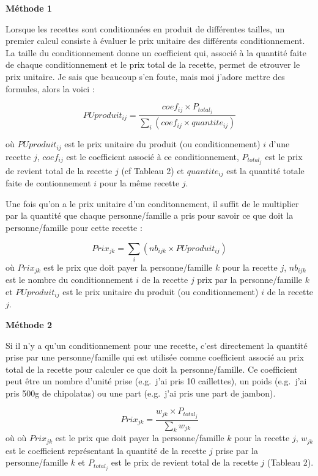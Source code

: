 \documentclass[]{article}
\begin{document}
\textbf{Méthode 1}

Lorsque les recettes sont conditionnées en produit de différentes
tailles, un premier calcul consiste à évaluer le prix unitaire des
différents conditionnement. La taille du conditionnement donne un
coefficient qui, associé à la quantité faite de chaque conditionnement
et le prix total de la recette, permet de etrouver le prix unitaire. Je
sais que beaucoup s'en foute, mais moi j'adore mettre des formules,
alors la voici :

\[PUproduit_{ij} = \frac{coef_{ij} \times P_{total_{j}}}{\sum_{i}\left(coef_{ij} \times quantite_{ij}\right)}\]

où \(PUproduit_{ij}\) est le prix unitaire du produit (ou
conditionnement) \(i\) d'une recette \(j\), \(coef_{ij}\) est le
coefficient associé à ce conditionnement, \(P_{total_{j}}\) est le prix
de revient total de la recette \(j\) (cf Tableau 2) et \(quantite_{ij}\)
est la quantité totale faite de contionnement \(i\) pour la même recette
\(j\).

Une fois qu'on a le prix unitaire d'un conditonnement, il suffit de le
multiplier par la quantité que chaque personne/famille a pris pour
savoir ce que doit la personne/famille pour cette recette :

\[Prix_{jk} = \sum_{i}\left(nb_{ijk} \times PUproduit_{ij}\right)\] où
\(Prix_{jk}\) est le prix que doit payer la personne/famille \(k\) pour
la recette \(j\), \(nb_{ijk}\) est le nombre du conditionnement \(i\) de
la recette \(j\) prix par la personne/famille \(k\) et
\(PUproduit_{ij}\) est le prix unitaire du produit (ou conditionnement)
\(i\) de la recette \(j\).

\textbf{Méthode 2}

Si il n'y a qu'un conditionnement pour une recette, c'est directement la
quantité prise par une personne/famille qui est utilisée comme
coefficient associé au prix total de la recette pour calculer ce que
doit la personne/famille. Ce coefficient peut être un nombre d'unité
prise (e.g.~j'ai pris 10 caillettes), un poids (e.g.~j'ai pris 500g de
chipolatas) ou une part (e.g.~j'ai pris une part de jambon).

\[Prix_{jk} = \frac{w_{jk} \times P_{total_{j}}}{\sum_{k} w_{jk}}\] où
où \(Prix_{jk}\) est le prix que doit payer la personne/famille \(k\)
pour la recette \(j\), \(w_{jk}\) est le coefficient représentant la
quantité de la recette \(j\) prise par la personne/famille \(k\) et
\(P_{total_{j}}\) est le prix de revient total de la recette \(j\)
(Tableau 2).
\end{document}
